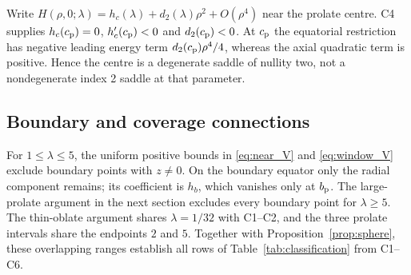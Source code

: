 Write $H(\rho,0;\lambda)=h_c(\lambda)+d_2(\lambda)\rho^2+O(\rho^4)$ near the prolate centre. C4 supplies $h_c(c_{\mathrm p})=0$, $h_c'(c_{\mathrm p})<0$ and $d_2(c_{\mathrm p})<0$. At $c_{\mathrm p}$ the equatorial restriction has negative leading energy term $d_2(c_{\mathrm p})\rho^4/4$, whereas the axial quadratic term is positive. Hence the centre is a degenerate saddle of nullity two, not a nondegenerate index 2 saddle at that parameter.



\subsection{Boundary and coverage connections}
For $1\le\lambda\le5$, the uniform positive bounds in \eqref{eq:near_V} and \eqref{eq:window_V} exclude boundary points with $z\ne0$. On the boundary equator only the radial component remains; its coefficient is $h_b$, which vanishes only at $b_{\mathrm p}$. The large-prolate argument in the next section excludes every boundary point for $\lambda\ge5$. The thin-oblate argument shares $\lambda=1/32$ with C1--C2, and the three prolate intervals share the endpoints $2$ and $5$. Together with Proposition~\ref{prop:sphere}, these overlapping ranges establish all rows of Table~\ref{tab:classification} from C1--C6.
